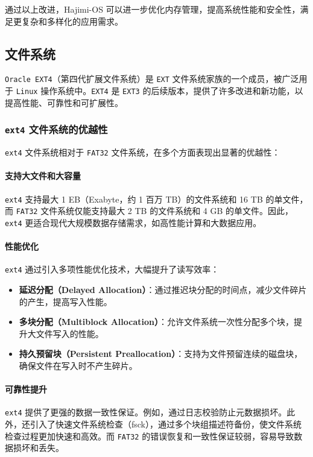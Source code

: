 \documentclass[UTF8]{article}
\begin{document}
通过以上改进，Hajimi-OS 可以进一步优化内存管理，提高系统性能和安全性，满足更复杂和多样化的应用需求。

\subsection{文件系统}
\texttt{Oracle EXT4}（第四代扩展文件系统）是 \texttt{EXT} 文件系统家族的一个成员，被广泛用于 \texttt{Linux} 操作系统中。\texttt{EXT4} 是 \texttt{EXT3} 的后续版本，提供了许多改进和新功能，以提高性能、可靠性和可扩展性。
\subsubsection{\texttt{ext4} 文件系统的优越性}

\texttt{ext4} 文件系统相对于 \texttt{FAT32} 文件系统，在多个方面表现出显著的优越性：

\paragraph{支持大文件和大容量}
\texttt{ext4} 支持最大 1 EB（Exabyte，约 1 百万 TB）的文件系统和 16 TB 的单文件，而 \texttt{FAT32} 文件系统仅能支持最大 2 TB 的文件系统和 4 GB 的单文件。因此，\texttt{ext4} 更适合现代大规模数据存储需求，如高性能计算和大数据应用。

\paragraph{性能优化}
\texttt{ext4} 通过引入多项性能优化技术，大幅提升了读写效率：
\begin{itemize}
  \item \textbf{延迟分配（Delayed Allocation）}：通过推迟块分配的时间点，减少文件碎片的产生，提高写入性能。
  \item \textbf{多块分配（Multiblock Allocation）}：允许文件系统一次性分配多个块，提升大文件写入的性能。
  \item \textbf{持久预留块（Persistent Preallocation）}：支持为文件预留连续的磁盘块，确保文件在写入时不产生碎片。
\end{itemize}

\paragraph{可靠性提升}
\texttt{ext4} 提供了更强的数据一致性保证。例如，通过日志校验防止元数据损坏。此外，还引入了快速文件系统检查（fsck），通过多个块组描述符备份，使文件系统检查过程更加快速和高效。而 \texttt{FAT32} 的错误恢复和一致性保证较弱，容易导致数据损坏和丢失。
\end{document}
